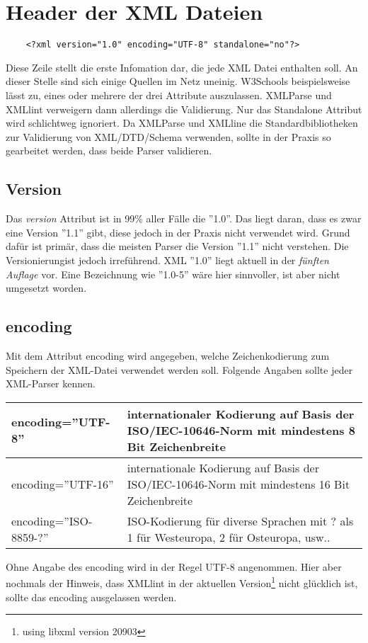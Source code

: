 \section{Header der XML Dateien}\label{xml:header}
\begin{verbatim}
    <?xml version="1.0" encoding="UTF-8" standalone="no"?>
\end{verbatim}

Diese Zeile stellt die erste Infomation dar, die jede XML Datei enthalten soll. An dieser Stelle sind sich einige
Quellen im Netz uneinig. W3Schools beispielsweise lässt zu, eines oder mehrere der drei Attribute auszulassen. XMLParse
und XMLlint verweigern dann allerdings die Validierung. Nur das Standalone Attribut wird schlichtweg ignoriert. Da
XMLParse und XMLline die Standardbibliotheken zur Validierung von XML/DTD/Schema verwenden, sollte in der Praxis so
gearbeitet werden, dass beide Parser validieren.
\subsection{Version}
Das \textit{version} Attribut ist in 99\% aller Fälle die ''1.0''. Das liegt daran, dass es zwar eine Version ''1.1''
gibt, diese jedoch in der Praxis nicht verwendet wird. Grund dafür ist primär, dass die meisten Parser die Version
''1.1'' nicht verstehen. Die Versionierungist jedoch irreführend. XML ''1.0'' liegt aktuell in der \textit{fünften
Auflage} vor. Eine Bezeichnung wie ''1.0-5'' wäre hier sinnvoller, ist aber nicht umgesetzt worden.

\subsection{encoding}
Mit dem Attribut encoding wird angegeben, welche Zeichenkodierung zum Speichern der XML-Datei verwendet werden soll. Folgende
Angaben sollte jeder XML-Parser kennen.
\begin{longtable}{|l|p{9cm}|}\hline
  encoding=''UTF-8'' & internationaler Kodierung auf Basis der ISO/IEC-10646-Norm mit mindestens 8 Bit Zeichenbreite
  \\\hline
  encoding=''UTF-16'' & internationale Kodierung auf Basis der ISO/IEC-10646-Norm mit mindestens 16 Bit Zeichenbreite
  \\\hline
  encoding=''ISO-8859-?'' & ISO-Kodierung für diverse Sprachen mit ? als 1 für Westeuropa, 2 für Osteuropa, usw.. 
  \\\hline
\end{longtable}
Ohne Angabe des encoding wird in der Regel UTF-8 angenommen. Hier aber nochmals der Hinweis, dass XMLlint in der
aktuellen Version\footnote{using libxml version 20903} nicht glücklich ist, sollte das encoding ausgelassen werden.


